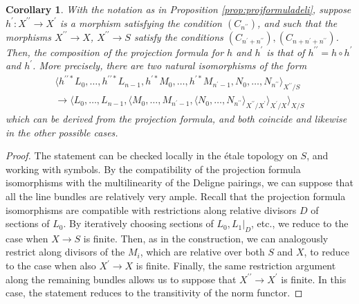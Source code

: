 \documentclass[11pt]{article}
\theoremstyle{plain}
\newtheorem{corollary}[theorem]{Corollary}
\theoremstyle{definition}
\newcommand{\bis}{\prime\prime}
\begin{document}
\begin{corollary} \label{cor:compprojformula}
With the notation as in Proposition \ref{prop:projformuladeli}, suppose $h^{\prime}: X^{\bis} \to X^{\prime}$ is a morphism satisfying the condition $(C_{n^{\bis}})$, and such that the morphisms $X^{\bis} \to X$, $X^{\bis} \to S$ satisfy the conditions $(C_{n^{\prime} + n^{\bis}}), (C_{n+n^{\prime} + n^{\bis}})$. Then, the composition of the projection formula for $h$ and $h^{\prime}$ is that of $ h^{\bis}=h\circ h^{\prime}$ and $h^{\prime}$. More precisely, there are two natural isomorphisms of the form
\begin{multline*}
\langle h^{\bis \ast } L_0, \ldots, h^{\bis \ast}L_{n-1}, h^{\prime\ast} M_0, \ldots, h^{\prime\ast} M_{n^{\prime}-1}, N_{0}, \ldots, N_{n^{\bis}} \rangle_{X^{\bis}/S}\\
\to
\langle L_{0},\ldots, L_{n-1}, \langle M_{0},\ldots, M_{n^{\prime}-1},\langle N_{0},\ldots,N_{n^{\bis}}\rangle_{X^{\bis}/X^{\prime}}\rangle_{X^{\prime}/X}\rangle_{X/S}
\end{multline*}
which can be derived from the projection formula, and both coincide and likewise in the other possible cases.
\end{corollary}
\begin{proof}
The statement can be checked locally in the étale topology on $S$, and working with symbols. By the compatibility of the projection formula isomorphisms with the multilinearity of the Deligne pairings, we can suppose that all the line bundles are relatively very ample. Recall that the projection formula isomorphisms are compatible with restrictions along relative divisors $D$ of sections of $L_0$. By iteratively choosing sections of $L_0, L_1|_D $, etc., we reduce to the case when $X \to S$ is finite. Then, as in the construction, we can analogously restrict along divisors of the $M_i$, which are relative over both $S$ and $X$, to reduce to the case when also $X^{\prime} \to X$ is finite. Finally, the same restriction argument along the remaining bundles allows us to suppose that $X^{\bis} \to X^{\prime}$ is finite. In this case, the statement reduces to the transitivity of the norm functor.
\end{proof}
\end{document}
